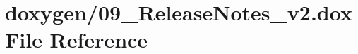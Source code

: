 \hypertarget{09__ReleaseNotes__v2_8dox}{\section{doxygen/09\+\_\+\+Release\+Notes\+\_\+v2.dox File Reference}
\label{09__ReleaseNotes__v2_8dox}
}
